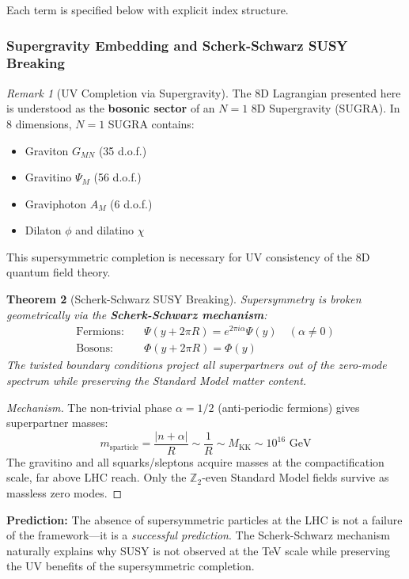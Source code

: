 \documentclass[11pt,a4paper]{article}
\theoremstyle{plain}
\newtheorem{theorem}{Theorem}[section]
\theoremstyle{definition}
\theoremstyle{remark}
\newtheorem{remark}[theorem]{Remark}
\newcommand{\Ztwo}{\mathbb{Z}_2}
\begin{document}
Each term is specified below with explicit index structure.

\subsubsection{Supergravity Embedding and Scherk-Schwarz SUSY Breaking}

\begin{remark}[UV Completion via Supergravity]
The 8D Lagrangian presented here is understood as the \textbf{bosonic sector} of an $N=1$ 8D Supergravity (SUGRA). In 8 dimensions, $N=1$ SUGRA contains:
\begin{itemize}
  \item Graviton $G_{MN}$ (35 d.o.f.)
  \item Gravitino $\Psi_M$ (56 d.o.f.)
  \item Graviphoton $A_M$ (6 d.o.f.)
  \item Dilaton $\phi$ and dilatino $\chi$
\end{itemize}
This supersymmetric completion is necessary for UV consistency of the 8D quantum field theory.
\end{remark}

\begin{theorem}[Scherk-Schwarz SUSY Breaking]
Supersymmetry is broken geometrically via the \textbf{Scherk-Schwarz mechanism}:
\begin{align}
\text{Fermions:} \quad & \Psi(y + 2\pi R) = e^{2\pi i \alpha} \Psi(y) \quad (\alpha \neq 0) \\
\text{Bosons:} \quad & \Phi(y + 2\pi R) = \Phi(y)
\end{align}
The twisted boundary conditions project all superpartners out of the zero-mode spectrum while preserving the Standard Model matter content.
\end{theorem}

\begin{proof}[Mechanism]
The non-trivial phase $\alpha = 1/2$ (anti-periodic fermions) gives superpartner masses:
\begin{equation}
m_{\text{sparticle}} = \frac{|n + \alpha|}{R} \sim \frac{1}{R} \sim M_{\text{KK}} \sim 10^{16} \text{ GeV}
\end{equation}
The gravitino and all squarks/sleptons acquire masses at the compactification scale, far above LHC reach. Only the $\Ztwo$-even Standard Model fields survive as massless zero modes.
\end{proof}

\textbf{Prediction:} The absence of supersymmetric particles at the LHC is not a failure of the framework---it is a \emph{successful prediction}. The Scherk-Schwarz mechanism naturally explains why SUSY is not observed at the TeV scale while preserving the UV benefits of the supersymmetric completion.
\end{document}
